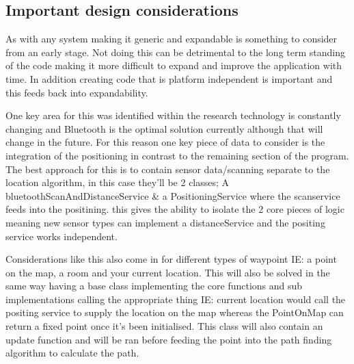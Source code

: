 \subsection{Important design considerations}
As with any system making it generic and expandable is something to consider from an early stage. Not doing this can be detrimental to the long term standing of the code making it more difficult to expand and improve the application with time. In addition creating code that is platform independent is important and this feeds back into expandability.

One key area for this was identified within the research \citetemp technology is constantly changing and Bluetooth is the optimal solution currently although that will change in the future. For this reason one key piece of data to consider is the integration of the positioning in contrast to the remaining section of the program. The best approach for this is to contain sensor data/scanning separate to the location algorithm, in this case they'll be 2 classes; A bluetoothScanAndDistanceService \& a PositioningService where the scanservice feeds into the positining. this gives the ability to isolate the 2 core pieces of logic meaning new sensor types can implement a distanceService and the positing service works independent.

Considerations like this also come in for different types of waypoint IE: a point on the map, a room and your current location. This will also be solved in the same way having a base class implementing the core functions and sub implementations calling the appropriate thing IE: current location would call the positing service to supply the location on the map whereas the PointOnMap can return a fixed point once it's been initialised. This class will also contain an update function and will be ran before feeding the point into the path finding algorithm to calculate the path.








